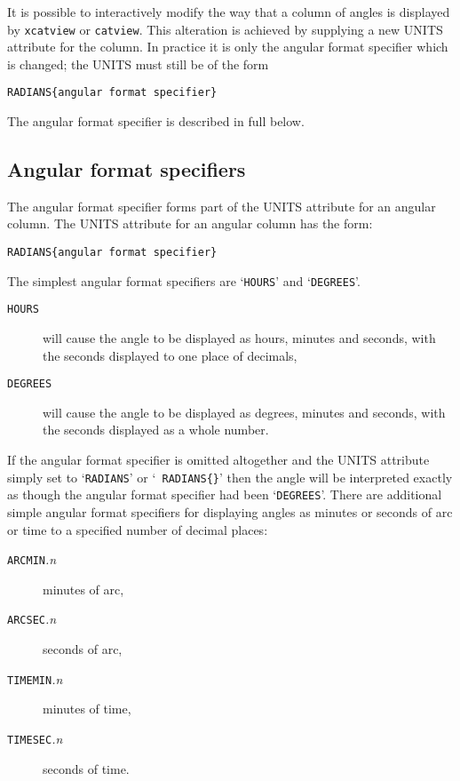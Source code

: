 \documentclass[twoside,11pt]{article}
\renewcommand{\_}{\texttt{\symbol{95}}}
\begin{document}
It is possible to interactively modify the way that a column of angles
is displayed by {\tt xcatview} or {\tt catview}. This alteration is
achieved by supplying a new UNITS attribute for the column. In practice
it is only the angular format specifier which is changed; the UNITS must
still be of the form

\begin{center}
{\tt RADIANS\{angular format specifier\} }
\end{center}

The angular format specifier is described in full below.

\subsection{Angular format specifiers}

The angular format specifier forms part of the UNITS attribute for an
angular column. The UNITS attribute for an angular column has the
form:

\begin{center}
{\tt RADIANS\{angular format specifier\} }
\end{center}

The simplest angular format specifiers are `{\tt HOURS}' and 
`{\tt DEGREES}'.

\begin{description}

  \item[{\tt HOURS}] will cause the angle to be displayed as 
   hours, minutes and seconds, with the seconds displayed to one 
   place of decimals,

  \item[{\tt DEGREES}] will cause the angle to be displayed as 
   degrees, minutes and seconds, with the seconds displayed as a 
   whole number.

\end{description}

If the angular format specifier is omitted altogether and 
the UNITS attribute simply set to `{\tt RADIANS}' or `{\tt 
RADIANS\{\}}' then the angle will be interpreted exactly as 
though the angular format specifier had been `{\tt DEGREES}'.
There are additional simple angular format specifiers for displaying
angles as minutes or seconds of arc or time to a specified number of
decimal places:

\begin{description}

  \item[{\tt ARCMIN}{\it .n}] minutes of arc,

  \item[{\tt ARCSEC}{\it .n}] seconds of arc,

  \item[{\tt TIMEMIN}{\it .n}] minutes of time,

  \item[{\tt TIMESEC}{\it .n}] seconds of time.


\end{description}
\end{document}
